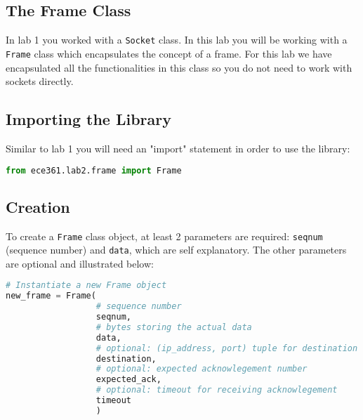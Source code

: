 \documentclass[11pt]{article}
\begin{document}
\subsection{The Frame Class}
In lab 1 you worked with a \texttt{Socket} class. In this lab you will be working with a \texttt{Frame} class which encapsulates the concept of a frame. For this lab we have encapsulated all the functionalities in this class so you do not need to work with sockets directly.

\subsection{Importing the Library}
Similar to lab 1 you will need an "import" statement in order to use the library:
\begin{lstlisting}[caption={Import Statement}, language=python]
from ece361.lab2.frame import Frame
\end{lstlisting}

\subsection{Creation}
To create a \texttt{Frame} class object, at least 2 parameters are required: \texttt{seqnum} (sequence number) and \texttt{data}, which are self explanatory. The other parameters are optional and illustrated below:
\begin{lstlisting}[caption={Frame Object Instantiation}, language=python]
# Instantiate a new Frame object
new_frame = Frame(
                  # sequence number
                  seqnum,
                  # bytes storing the actual data
                  data,
                  # optional: (ip_address, port) tuple for destination
                  destination,
                  # optional: expected acknowlegement number
                  expected_ack,
                  # optional: timeout for receiving acknowlegement
                  timeout
                  )
\end{lstlisting}
\end{document}
